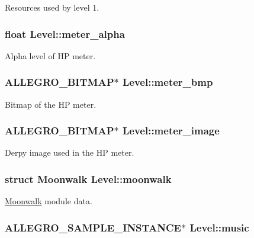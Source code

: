 Resources used by level 1. \hypertarget{structLevel_a246ce1ecf1523db218cf067df15e511f}{
\subsubsection[{meter\-\_\-alpha}]{\setlength{\rightskip}{0pt plus 5cm}float Level\-::meter\-\_\-alpha}}\label{structLevel_a246ce1ecf1523db218cf067df15e511f}
Alpha level of H\-P meter. \hypertarget{structLevel_a4e78a54cbf3cdcc804f65acb03cef0b3}{
\subsubsection[{meter\-\_\-bmp}]{\setlength{\rightskip}{0pt plus 5cm}A\-L\-L\-E\-G\-R\-O\-\_\-\-B\-I\-T\-M\-A\-P$\ast$ Level\-::meter\-\_\-bmp}}\label{structLevel_a4e78a54cbf3cdcc804f65acb03cef0b3}
Bitmap of the H\-P meter. \hypertarget{structLevel_a371c97dfa3d564a19648cb1b72edbf60}{
\subsubsection[{meter\-\_\-image}]{\setlength{\rightskip}{0pt plus 5cm}A\-L\-L\-E\-G\-R\-O\-\_\-\-B\-I\-T\-M\-A\-P$\ast$ Level\-::meter\-\_\-image}}\label{structLevel_a371c97dfa3d564a19648cb1b72edbf60}
Derpy image used in the H\-P meter. \hypertarget{structLevel_ab9e39b9ac0f342332e034c59d55d6a07}{
\subsubsection[{moonwalk}]{\setlength{\rightskip}{0pt plus 5cm}struct {\bf Moonwalk} Level\-::moonwalk}}\label{structLevel_ab9e39b9ac0f342332e034c59d55d6a07}
\hyperlink{structMoonwalk}{Moonwalk} module data. \hypertarget{structLevel_a41c6aae8f508e078b02c291e1d6f8e67}{
\subsubsection[{music}]{\setlength{\rightskip}{0pt plus 5cm}A\-L\-L\-E\-G\-R\-O\-\_\-\-S\-A\-M\-P\-L\-E\-\_\-\-I\-N\-S\-T\-A\-N\-C\-E$\ast$ Level\-::music}}\label{structLevel_a41c6aae8f508e078b02c291e1d6f8e67}
